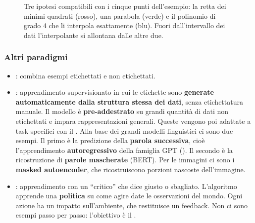 \begin{figure}[ht]
\centering
{}
\caption{Tre ipotesi compatibili con i cinque punti dell'esempio: la retta dei minimi quadrati (rosso), una
parabola (verde) e il polinomio di grado 4 che li interpola esattamente (blu). Fuori dall'intervallo dei dati
l'interpolante si allontana dalle altre due.}
\label{fig:quale-funzione}
\end{figure}

\subsubsection{Altri paradigmi}
\begin{itemize}
  \item {}: combina esempi etichettati e non etichettati.
  \item {}: apprendimento supervisionato in cui le etichette sono \textbf{generate
        automaticamente dalla struttura stessa dei dati}, senza etichettatura manuale. Il modello è
        \textbf{pre-addestrato} su grandi quantità di dati non etichettati e impara rappresentazioni generali.
        Queste vengono poi adattate a task specifici con il . Alla base dei grandi modelli
        linguistici ci sono due esempi. Il primo è la predizione della \textbf{parola successiva}, cioè
        l'apprendimento \textbf{autoregressivo} della famiglia GPT ().
        Il secondo è la ricostruzione di \textbf{parole mascherate} (BERT). Per le immagini ci sono i
        \textbf{masked autoencoder}, che ricostruiscono porzioni nascoste dell'immagine.
  \item {}: apprendimento con un ``critico'' che dice giusto o sbagliato.
        L'algoritmo apprende una \textbf{politica} su come agire date le osservazioni del mondo. Ogni azione ha un
        impatto sull'ambiente, che restituisce un feedback. Non ci sono esempi passo per passo: l'obiettivo è il
        .
\end{itemize}

